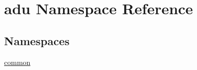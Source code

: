 \hypertarget{namespaceadu}{\section{adu Namespace Reference}
\label{namespaceadu}
}
\subsection*{Namespaces}
\begin{DoxyCompactItemize}
\item 
\hyperlink{namespaceadu_1_1common}{common}
\end{DoxyCompactItemize}
